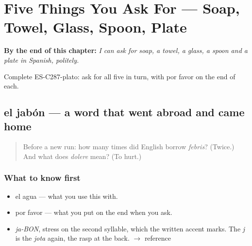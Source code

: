 
\chapter{Five Things You Ask For --- Soap, Towel, Glass, Spoon, Plate}
\label{ch:cinco-cosas}

\begin{chapteropening}
\textbf{By the end of this chapter:} \emph{I can ask for soap, a towel, a glass, a spoon and a plate in Spanish, politely.}

Complete ES-C287-plato: ask for all five in turn, with por favor on the end of each.
\end{chapteropening}

\section[el jabón]{el jabón — a word that went abroad and came home}

\label{lesson:ES-C287-jabon}



\begin{quote}
Before a new run: how many times did English borrow \emph{febris}? (Twice.) And what does \emph{dolere} mean? (To hurt.)
\end{quote}

\subsection*{What to know first}
\begin{itemize}
\raggedright
  \item el agua — what you use this with.
  \item por favor — what you put on the end when you ask.
\end{itemize}

\begin{sounds}
\begin{itemize}
\raggedright
  \item \emph{ja-BON}, stress on the second syllable, which the written accent marks. The \emph{j} is the \emph{jota} again, the rasp at the back. $\to$ reference
\end{itemize}
\end{sounds}

